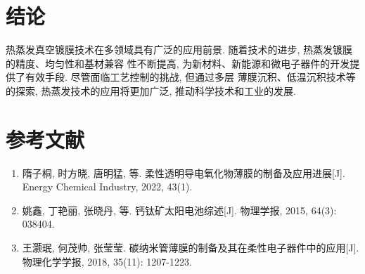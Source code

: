 \documentclass[UTF8]{ctexart}
\begin{document}
\section{结论}
热蒸发真空镀膜技术在多领域具有广泛的应用前景. 随着技术的进步, 热蒸发镀膜的精度、均匀性和基材兼容
性不断提高, 为新材料、新能源和微电子器件的开发提供了有效手段. 尽管面临工艺控制的挑战, 但通过多层
薄膜沉积、低温沉积技术等的探索, 热蒸发技术的应用将更加广泛, 推动科学技术和工业的发展. 
\section*{参考文献}
\begin{enumerate}
	\item 隋子桐, 时方晓, 唐明猛, 等. 柔性透明导电氧化物薄膜的制备及应用进展[J]. Energy Chemical Industry, 2022, 43(1).
	\item 姚鑫, 丁艳丽, 张晓丹, 等. 钙钛矿太阳电池综述[J]. 物理学报, 2015, 64(3): 038404.
	\item 王灏珉, 何茂帅, 张莹莹. 碳纳米管薄膜的制备及其在柔性电子器件中的应用[J]. 物理化学学报, 2018, 35(11): 1207-1223.
\end{enumerate}
\end{document}
